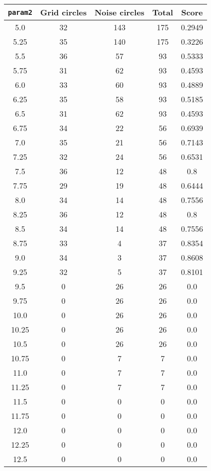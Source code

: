 \documentclass[letterpaper, 12pt]{article}
\begin{document}
\begin{longtable}{|c|c|c|c|c|}
\hline
\textbf{\texttt{param2}} & \textbf{Grid circles} & \textbf{Noise circles} & \textbf{Total} & \textbf{Score} \\
\hline
5.0 & 32 & 143 & 175 & 0.2949 \\
\hline
5.25 & 35 & 140 & 175 & 0.3226 \\
\hline
5.5 & 36 & 57 & 93 & 0.5333 \\
\hline
5.75 & 31 & 62 & 93 & 0.4593 \\
\hline
6.0 & 33 & 60 & 93 & 0.4889 \\
\hline
6.25 & 35 & 58 & 93 & 0.5185 \\
\hline
6.5 & 31 & 62 & 93 & 0.4593 \\
\hline
6.75 & 34 & 22 & 56 & 0.6939 \\
\hline
7.0 & 35 & 21 & 56 & 0.7143 \\
\hline
7.25 & 32 & 24 & 56 & 0.6531 \\
\hline
7.5 & 36 & 12 & 48 & 0.8 \\
\hline
7.75 & 29 & 19 & 48 & 0.6444 \\
\hline
8.0 & 34 & 14 & 48 & 0.7556 \\
\hline
8.25 & 36 & 12 & 48 & 0.8 \\
\hline
8.5 & 34 & 14 & 48 & 0.7556 \\
\hline
8.75 & 33 & 4 & 37 & 0.8354 \\
\hline
9.0 & 34 & 3 & 37 & 0.8608 \\
\hline
9.25 & 32 & 5 & 37 & 0.8101 \\
\hline
9.5 & 0 & 26 & 26 & 0.0 \\
\hline
9.75 & 0 & 26 & 26 & 0.0 \\
\hline
10.0 & 0 & 26 & 26 & 0.0 \\
\hline
10.25 & 0 & 26 & 26 & 0.0 \\
\hline
10.5 & 0 & 26 & 26 & 0.0 \\
\hline
10.75 & 0 & 7 & 7 & 0.0 \\
\hline
11.0 & 0 & 7 & 7 & 0.0 \\
\hline
11.25 & 0 & 7 & 7 & 0.0 \\
\hline
11.5 & 0 & 0 & 0 & 0.0 \\
\hline
11.75 & 0 & 0 & 0 & 0.0 \\
\hline
12.0 & 0 & 0 & 0 & 0.0 \\
\hline
12.25 & 0 & 0 & 0 & 0.0 \\
\hline
12.5 & 0 & 0 & 0 & 0.0 \\

\end{longtable}
\end{document}
